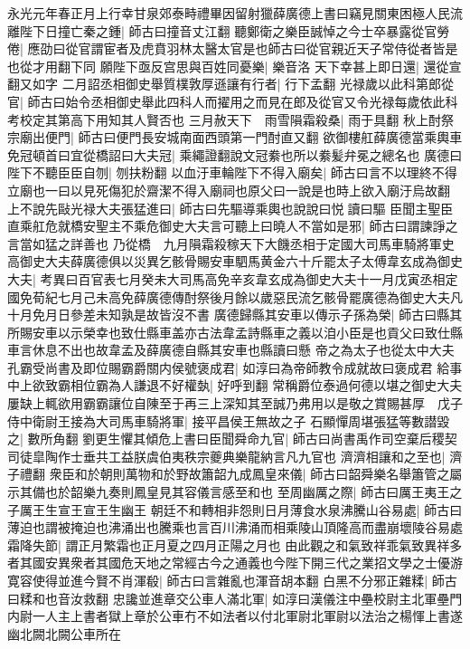 永光元年春正月上行幸甘泉郊泰畤禮畢因留射獵薛廣德上書曰竊見關東困極人民流離陛下日撞亡秦之鍾|{
	師古曰撞音丈江翻}
聽鄭衛之樂臣誠悼之今士卒暴露從官勞倦|{
	應劭曰從官謂宦者及虎賁羽林太醫太官是也師古曰從官親近天子常侍從者皆是也從才用翻下同}
願陛下亟反宫思與百姓同憂樂|{
	樂音洛}
天下幸甚上即日還|{
	還從宣翻又如字}
二月詔丞相御史舉質樸敦厚遜讓有行者|{
	行下孟翻}
光禄歲以此科第郎從官|{
	師古曰始令丞相御史舉此四科人而擢用之而見在郎及從官又令光禄每歲依此科考校定其第高下用知其人賢否也}
三月赦天下　雨雪隕霜殺桑|{
	雨于具翻}
秋上酎祭宗廟出便門|{
	師古曰便門長安城南面西頭第一門酎直又翻}
欲御樓舡薛廣德當乘輿車免冠頓首曰宜從橋詔曰大夫冠|{
	乘繩證翻說文冠絭也所以絭髪弁冕之總名也}
廣德曰陛下不聽臣臣自刎|{
	刎扶粉翻}
以血汙車輪陛下不得入廟矣|{
	師古曰言不以理終不得立廟也一曰以見死傷犯於齋潔不得入廟祠也原父曰一說是也時上欲入廟汙烏故翻}
上不說先敺光禄大夫張猛進曰|{
	師古曰先驅導乘輿也說說曰悦讀曰驅}
臣聞主聖臣直乘舡危就橋安聖主不乘危御史大夫言可聽上曰曉人不當如是邪|{
	師古曰謂諫諍之言當如猛之詳善也}
乃從橋　九月隕霜殺稼天下大饑丞相于定國大司馬車騎將軍史高御史大夫薛廣德俱以災異乞骸骨賜安車駟馬黄金六十斤罷太子太傅韋玄成為御史大夫|{
	考異曰百官表七月癸未大司馬高免辛亥韋玄成為御史大夫十一月戊寅丞相定國免荀紀七月己未高免薛廣德傳酎祭後月餘以歲惡民流乞骸骨罷廣德為御史大夫凡十月免月日參差未知孰是故皆沒不書}
廣德歸縣其安車以傳示子孫為榮|{
	師古曰縣其所賜安車以示榮幸也致仕縣車盖亦古法韋孟詩縣車之義以洎小臣是也貢父曰致仕縣車言休息不出也故韋孟及薛廣德自縣其安車也縣讀曰懸}
帝之為太子也從太中大夫孔霸受尚書及即位賜霸爵關内侯號褒成君|{
	如淳曰為帝師教令成就故曰褒成君}
給事中上欲致霸相位霸為人謙退不好權埶|{
	好呼到翻}
常稱爵位泰過何德以堪之御史大夫屢缺上輒欲用霸霸讓位自陳至于再三上深知其至誠乃弗用以是敬之賞賜甚厚　戊子侍中衛尉王接為大司馬車騎將軍|{
	接平昌侯王無故之子}
石顯憚周堪張猛等數譛毀之|{
	數所角翻}
劉更生懼其傾危上書曰臣聞舜命九官|{
	師古曰尚書禹作司空棄后稷契司徒皐陶作士垂共工益朕虞伯夷秩宗夔典樂龍納言凡九官也}
濟濟相讓和之至也|{
	濟子禮翻}
衆臣和於朝則萬物和於野故簫韶九成鳳皇來儀|{
	師古曰韶舜樂名舉簫管之屬示其備也於韶樂九奏則鳳皇見其容儀言感至和也}
至周幽厲之際|{
	師古曰厲王夷王之子厲王生宣王宣王生幽王}
朝廷不和轉相非怨則日月薄食水泉沸騰山谷易處|{
	師古曰薄迫也謂被掩迫也沸涌出也騰乘也言百川沸涌而相乘陵山頂隆高而盡崩壞陵谷易處}
霜降失節|{
	謂正月繁霜也正月夏之四月正陽之月也}
由此觀之和氣致祥乖氣致異祥多者其國安異衆者其國危天地之常經古今之通義也今陛下開三代之業招文學之士優游寛容使得並進今賢不肖渾殽|{
	師古曰言雜亂也渾音胡本翻}
白黑不分邪正雜糅|{
	師古曰糅和也音汝救翻}
忠讒並進章交公車人滿北軍|{
	如淳曰漢儀注中壘校尉主北軍壘門内尉一人主上書者獄上章於公車冇不如法者以付北軍尉北軍尉以法治之楊惲上書遂幽北闕北闕公車所在}
